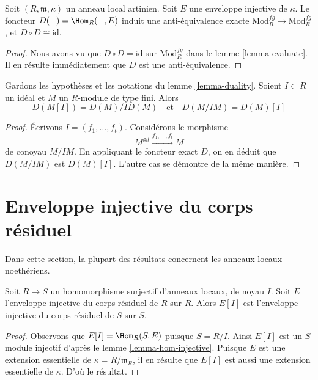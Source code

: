 \begin{lemma}
\label{lemma-duality}
Soit $(R, \mathfrak m, \kappa)$ un anneau local artinien.
Soit $E$ une enveloppe injective de $\kappa$.
Le foncteur $D(-) = \Hom_R(-, E)$ induit une anti-équivalence exacte
$\text{Mod}^{fg}_R \to \text{Mod}^{fg}_R$, et $D \circ D \cong \text{id}$.
\end{lemma}

\begin{proof}
Nous avons vu que $D \circ D = \text{id}$ sur $\text{Mod}^{fg}_R$ dans le lemme \ref{lemma-evaluate}.
Il en résulte immédiatement que $D$ est une anti-équivalence.
\end{proof}

\begin{lemma}
\label{lemma-duality-torsion-cotorsion}
Gardons les hypothèses et les notations du lemme \ref{lemma-duality}.
Soient $I \subset R$ un idéal et $M$ un $R$-module de type fini.
Alors
$$
D(M[I]) = D(M)/ID(M) \quad\text{et}\quad D(M/IM) = D(M)[I]
$$
\end{lemma}

\begin{proof}
Écrivons $I = (f_1, \ldots, f_t)$. Considérons le morphisme
$$
M^{\oplus t} \xrightarrow{f_1, \ldots, f_t} M
$$
de conoyau $M/IM$. En appliquant le foncteur exact $D$,
on en déduit que $D(M/IM)$ est $D(M)[I]$. L'autre cas se démontre de la même manière.
\end{proof}



\section{Enveloppe injective du corps résiduel}
\label{section-hull-residue-field}

\noindent
Dans cette section, la plupart des résultats concernent les anneaux locaux noethériens.

\begin{lemma}
\label{lemma-quotient}
Soit $R \to S$ un homomorphisme surjectif d'anneaux locaux, de noyau $I$.
Soit $E$ l'enveloppe injective du corps résiduel de $R$ sur $R$.
Alors $E[I]$ est l'enveloppe injective du corps résiduel de $S$ sur $S$.
\end{lemma}

\begin{proof}
Observons que $E[I] = \Hom_R(S, E)$ puisque $S = R/I$. Ainsi $E[I]$ est un $S$-module injectif
d'après le lemme \ref{lemma-hom-injective}. Puisque $E$ est une extension essentielle
de $\kappa = R/\mathfrak m_R$, il en résulte que $E[I]$ est aussi une extension essentielle
de $\kappa$. D'où le résultat.
\end{proof}

